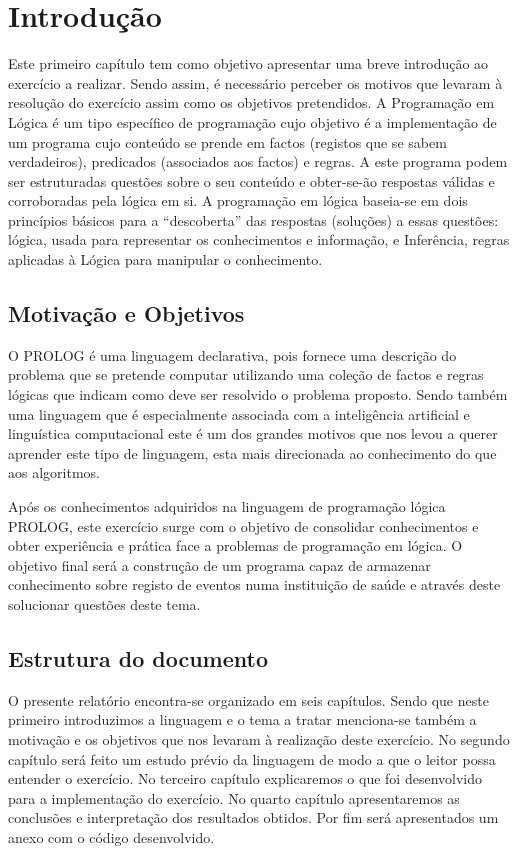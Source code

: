 \chapter{Introdução}
\label{cap:p1}
Este primeiro capítulo tem como objetivo apresentar uma breve introdução ao exercício a realizar. Sendo assim, é necessário perceber os motivos que levaram à resolução do exercício assim como os objetivos pretendidos.
A Programação em Lógica é um tipo específico de programação cujo objetivo é a implementação de um programa cujo conteúdo se prende em factos (registos que se sabem verdadeiros), predicados (associados aos factos) e regras. A este programa podem ser estruturadas questões sobre o seu conteúdo e obter-se-ão respostas válidas e corroboradas pela lógica em si.
A programação em lógica baseia-se em dois princípios básicos para a “descoberta” das respostas (soluções) a essas questões: lógica, usada para representar os conhecimentos e informação, e Inferência, regras aplicadas à Lógica para manipular o conhecimento.




\section{Motivação e Objetivos}
\label{p1:MotivObj}
O PROLOG é uma linguagem declarativa, pois fornece uma descrição do problema que se pretende computar utilizando uma coleção de factos e regras lógicas que indicam como deve ser resolvido o problema proposto. Sendo também uma linguagem que é especialmente associada com a inteligência artificial e linguística computacional este é um dos grandes motivos que nos levou a querer aprender este tipo de linguagem, esta mais direcionada ao conhecimento do que aos algoritmos. 


Após os conhecimentos adquiridos na linguagem de programação lógica PROLOG, este exercício surge com o objetivo de consolidar conhecimentos e obter experiência e prática face a problemas de programação em lógica. O objetivo final será a construção de um programa capaz de armazenar conhecimento sobre registo de eventos numa instituição de saúde e através deste solucionar questões deste tema.



\section{Estrutura do documento}
\label{p1:Estrutura}
O presente relatório encontra-se organizado em seis capítulos. Sendo que neste primeiro introduzimos a linguagem e o tema a tratar menciona-se também a motivação e os objetivos que nos levaram à realização deste exercício. 
No segundo capítulo será feito um estudo prévio da linguagem de modo a que o leitor possa entender o exercício. No terceiro capítulo explicaremos o que foi desenvolvido para a implementação do exercício. No quarto capítulo apresentaremos as conclusões e interpretação dos resultados obtidos. Por fim será apresentados um anexo com o código desenvolvido. 




